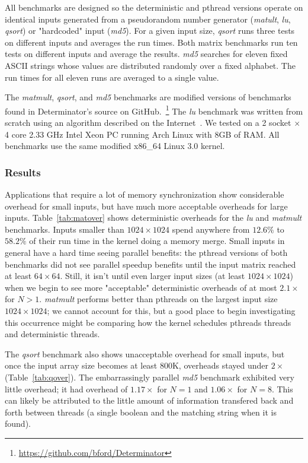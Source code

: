 All benchmarks are designed so the deterministic and pthread versions operate on
identical inputs generated from a pseudorandom number generator (\emph{matult},
\emph{lu}, \emph{qsort}) or "hardcoded" input (\emph{md5}).
For a given input size, \emph{qsort} runs three tests on different inputs and
averages the run times. Both matrix benchmarks run ten tests on different inputs
and average the results. \emph{md5} searches for eleven fixed ASCII strings
whose values are distributed randomly over a fixed alphabet. The run times for
all eleven runs are averaged to a single value.

The \emph{matmult}, \emph{qsort}, and \emph{md5} benchmarks are modified
versions of benchmarks found in Determinator's source on
GitHub.~\footnote{\url{https://github.com/bford/Determinator}}
The \emph{lu} benchmark was written from scratch using an algorithm described
on the Internet~\cite{lualg}. We tested on a 2 socket $\times$ 4 core 2.33 GHz
Intel Xeon PC running Arch Linux with 8GB of RAM. All benchmarks use the same
modified \mbox{x86\_64} Linux 3.0 kernel.

\subsubsection{Results}
Applications that require a lot of memory synchronization show considerable
overhead for small inputs, but have much more acceptable overheads for large
inputs.
\mbox{Table \ref{tab:matover}} shows deterministic overheads for the \emph{lu} and
\emph{matmult} benchmarks.
Inputs smaller than $1024\times 1024$ spend anywhere from $12.6\%$ to $58.2\%$
of their run time in the kernel doing a memory merge.
Small inputs in general have a hard time seeing parallel benefits: the pthread
versions of both benchmarks did not see parallel speedup benefits until the
input matrix reached at least $64\times 64$. Still, it isn't until even larger
input sizes (at least $1024\times 1024$) when we begin to
see more "acceptable" deterministic overheads of at
most $2.1\times$ for $N>1$. \emph{matmult}
performs better than pthreads on the largest input size $1024\times 1024$; we
cannot account for this, but a good place to begin investigating this
occurrence might be comparing how the kernel schedules pthreads threads and
deterministic threads.

The \emph{qsort} benchmark also shows unacceptable overhead for small inputs,
but once the input array size becomes at least 800K, overheads stayed under
$2\times$ (\mbox{Table \ref{tab:qover}}).
The embarrassingly parallel \emph{md5} benchmark exhibited very little overhead;
it had overhead of $1.17\times$ for $N=1$ and $1.06\times$ for $N=8$. This
can likely be attributed to the little amount of information transfered back and
forth between threads (a single boolean and the matching string when it is
found).

